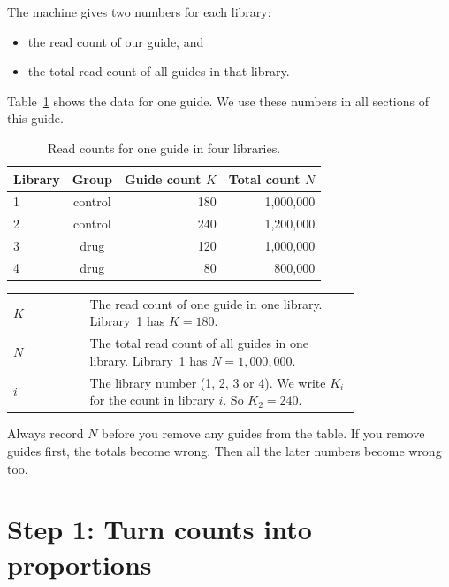 The machine gives two numbers for each library:

\begin{itemize}
\item the read count of our guide, and
\item the total read count of all guides in that library.
\end{itemize}

Table~\ref{tab:data} shows the data for one guide. We use these numbers in
all sections of this guide.

\begin{table}[h]
\centering
\caption{Read counts for one guide in four libraries.}
\label{tab:data}
\begin{tabular}{lcrr}
\toprule
Library & Group & Guide count $K$ & Total count $N$\\
\midrule
1 & control & 180 & 1{,}000{,}000\\
2 & control & 240 & 1{,}200{,}000\\
3 & drug    & 120 & 1{,}000{,}000\\
4 & drug    &  80 &   800{,}000\\
\bottomrule
\end{tabular}
\end{table}

\begin{symbols}
\begin{tabular}{@{}l p{0.78\linewidth}@{}}
$K$ & The read count of one guide in one library. Library~1 has $K=180$.\\
$N$ & The total read count of all guides in one library. Library~1 has
      $N=1{,}000{,}000$.\\
$i$ & The library number (1, 2, 3 or 4). We write $K_i$ for the count in
      library $i$. So $K_2=240$.\\
\end{tabular}
\end{symbols}

\begin{remember}
Always record $N$ before you remove any guides from the table. If you remove
guides first, the totals become wrong. Then all the later numbers become
wrong too.
\end{remember}

\section{Step 1: Turn counts into proportions}

